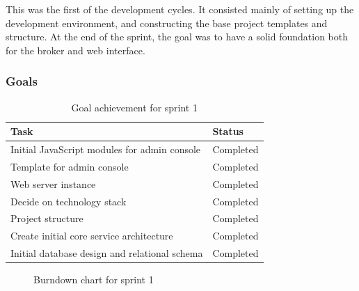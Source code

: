 This was the first of the development cycles. It consisted mainly of setting up the development environment, and constructing the base project templates and structure. At the end of the sprint, the goal was to have a solid foundation both for the broker and web interface.

\subsubsection{Goals}
\label{subsec:project_lifecycle-development-sprint_1-goals}

\begin{center}
\begin{table}[ht!]
\small
\centering
\begin{tabular}{|p{10cm}|p{2cm}|}
\hline
\rowcolor{lightgray}
 \textbf{Task} & \textbf{Status} \\
\hline
\rowcolor{green!30}
 Initial JavaScript modules for admin console & Completed  \\
 \rowcolor{green!30}
 Template for admin console & Completed \\ 
 \rowcolor{green!30}
 Web server instance & Completed \\ 
 \rowcolor{green!30}
 Decide on technology stack & Completed \\ 
 \rowcolor{green!30}
 Project structure & Completed \\
 \rowcolor{green!30}
 Create initial core service architecture & Completed \\
 \rowcolor{green!30}
 Initial database design and relational schema & Completed \\
\hline
\end{tabular}
\caption{Goal achievement for sprint 1}
\label{tab:sprint 1, goals}
\end{table}
\end{center}

\begin{center}
  \begin{figure}[htbp!]
    \caption{Burndown chart for sprint 1}
    \label{fig:sprint 1, burndown}
  \end{figure}
\end{center}

